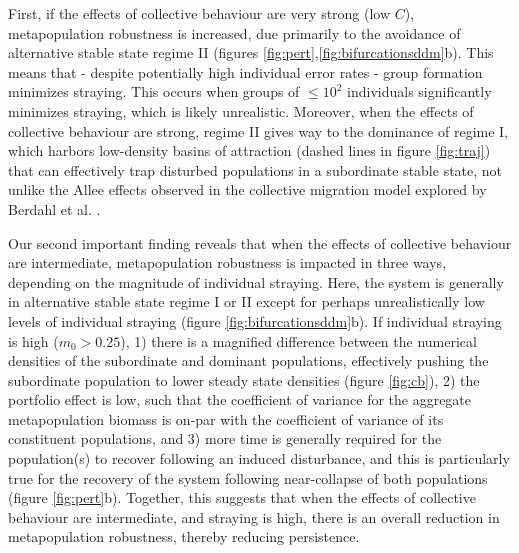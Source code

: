 \documentclass{revtex4}
\begin{document}
First, if the effects of collective behaviour are very strong (low $C$), metapopulation robustness is increased, due primarily to the avoidance of alternative stable state regime II (figures \ref{fig:pert},\ref{fig:bifurcationsddm}b).
This means that - despite potentially high individual error rates - group formation minimizes straying. 
This occurs when groups of $\leq 10^2$ individuals significantly minimizes straying, which is likely unrealistic.
Moreover, when the effects of collective behaviour are strong, regime II gives way to the dominance of regime I, which harbors low-density basins of attraction (dashed lines in figure \ref{fig:traj}) that can effectively trap disturbed populations in a subordinate stable state, not unlike the Allee effects observed in the collective migration model explored by Berdahl et al. \citep{Berdahl:2016dx}.


Our second important finding reveals that when the effects of collective behaviour are intermediate, metapopulation robustness is impacted in three ways, depending on the magnitude of individual straying.
Here, the system is generally in alternative stable state regime I or II except for perhaps unrealistically low levels of individual straying (figure \ref{fig:bifurcationsddm}b).
If individual straying is high ($m_0>0.25$),
1) there is a magnified difference between the numerical densities of the subordinate and dominant populations, effectively pushing the subordinate population to lower steady state densities (figure \ref{fig:cb}),
2) the portfolio effect is low, such that the coefficient of variance for the aggregate metapopulation biomass is on-par with the coefficient of variance of its constituent populations, and
3) more time is generally required for the population(s) to recover following an induced disturbance, and this is particularly true for the recovery of the system following near-collapse of both populations (figure \ref{fig:pert}b).
Together, this suggests that when the effects of collective behaviour are intermediate, and straying is high, there is an overall reduction in metapopulation robustness, thereby reducing persistence.
\end{document}
